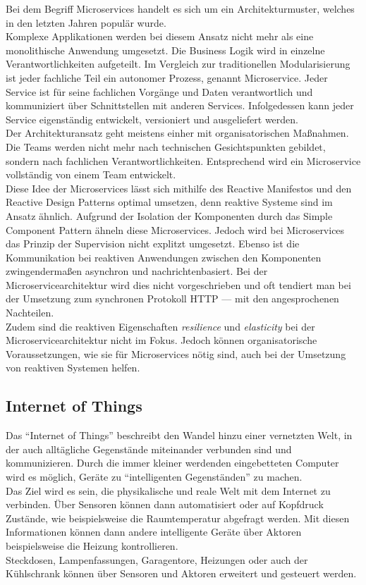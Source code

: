 Bei dem Begriff Microservices handelt es sich um ein Architekturmuster, welches in den letzten Jahren populär wurde.\\
Komplexe Applikationen werden bei diesem Ansatz nicht mehr als eine monolithische Anwendung umgesetzt. Die Business Logik wird in einzelne Verantwortlichkeiten aufgeteilt. Im Vergleich zur traditionellen Modularisierung ist jeder fachliche Teil ein autonomer Prozess, genannt Microservice. Jeder Service ist für seine fachlichen Vorgänge und Daten verantwortlich und kommuniziert über Schnittstellen mit anderen Services. Infolgedessen kann jeder Service eigenständig entwickelt, versioniert und ausgeliefert werden.\\
Der Architekturansatz geht meistens einher mit organisatorischen Maßnahmen. Die Teams werden nicht mehr nach technischen Gesichtspunkten gebildet, sondern nach fachlichen Verantwortlichkeiten. Entsprechend wird ein Microservice vollständig von einem Team entwickelt.\\

Diese Idee der Microservices lässt sich mithilfe des Reactive Manifestos und den Reactive Design Patterns optimal umsetzen, denn reaktive Systeme sind im Ansatz ähnlich. Aufgrund der Isolation der Komponenten durch das Simple Component Pattern ähneln diese Microservices. Jedoch wird bei Microservices das Prinzip der Supervision nicht explitzt umgesetzt. Ebenso ist die Kommunikation bei reaktiven Anwendungen zwischen den Komponenten zwingendermaßen asynchron und nachrichtenbasiert. Bei der Microservicearchitektur wird dies nicht vorgeschrieben und oft tendiert man bei der Umsetzung zum synchronen Protokoll HTTP --- mit den angesprochenen Nachteilen.\\
Zudem sind die reaktiven Eigenschaften \textit{resilience} und \textit{elasticity} bei der Microservicearchitektur nicht im Fokus. Jedoch können organisatorische Voraussetzungen, wie sie für Microservices nötig sind, auch bei der Umsetzung von reaktiven Systemen helfen.

\subsection{Internet of Things}
Das \enquote{Internet of Things} beschreibt den Wandel hinzu einer vernetzten Welt, in der auch alltägliche Gegenstände miteinander verbunden sind und kommunizieren. Durch die immer kleiner werdenden eingebetteten Computer wird es möglich, Geräte zu \enquote{intelligenten Gegenständen} zu machen.\\
Das Ziel wird es sein, die physikalische und reale Welt mit dem Internet zu verbinden. Über Sensoren können dann automatisiert oder auf Kopfdruck Zustände, wie beispielsweise die Raumtemperatur abgefragt werden. Mit diesen Informationen können dann andere intelligente Geräte über Aktoren beispielsweise die Heizung kontrollieren.\\
Steckdosen, Lampenfassungen, Garagentore, Heizungen oder auch der Kühlschrank können über Sensoren und Aktoren erweitert und gesteuert werden.\\

